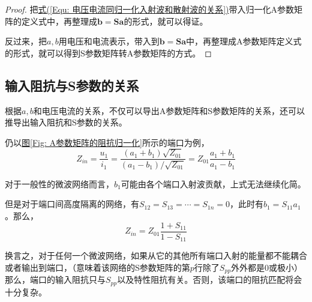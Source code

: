 \begin{tcbproof}
\begin{proof}
        把\hyperref[Equ: 电压电流同归一化入射波和散射波的关系]{式(\ref*{Equ: 电压电流同归一化入射波和散射波的关系})}带入归一化A参数矩阵的定义式中，再整理成$\bm{b}=\bm{S}\bm{a}$的形式，就可以得证。

        反过来，把$a,b$用电压和电流表示，带入到$\bm{b}=\bm{S}\bm{a}$中，再整理成A参数矩阵定义式的形式，就可以得到S参数矩阵转A参数矩阵的方式。
    \end{proof}\end{tcbproof}

    \subsection{输入阻抗与S参数的关系}
    根据$a,b$和电压电流的关系，不仅可以导出A参数矩阵和S参数矩阵的关系，还可以推导出输入阻抗和S参数的关系。

    仍以\hyperref[Fig: A参数矩阵的阻抗归一化]{图\ref*{Fig: A参数矩阵的阻抗归一化}}所示的端口为例，
    \begin{equation}
        Z_{in}=\frac{u_1}{i_1}
        =\frac{(a_1+b_1)\sqrt{Z_{01}}}{(a_1-b_1)/\sqrt{Z_{01}}}
        =Z_{01}\frac{a_1+b_1}{a_1-b_1}
    \end{equation}

    对于一般性的微波网络而言，$b_1$可能由各个端口入射波贡献，上式无法继续化简。

    但是对于端口间高度隔离的网络，有$S_{12}=S_{13}=\cdots=S_{1n}=0$，此时有$b_1=S_{11}a_1$。那么，
    \begin{equation}
        Z_{in}=Z_{01}\frac{1+S_{11}}{1-S_{11}}
    \end{equation}

    换言之，对于任何一个微波网络，如果从它的其他所有端口入射的能量都不能耦合或者输出到端口，（意味着该网络的S参数矩阵的第$p$行除了$S_{pp}外$外都是0或极小）那么，端口的输入阻抗只与$S_{pp}$以及特性阻抗有关。否则，该端口的阻抗匹配将会十分复杂。


